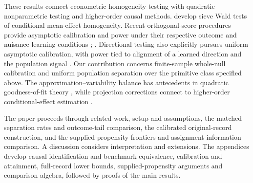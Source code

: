 These results connect econometric homogeneity testing with quadratic nonparametric testing and higher-order causal methods. \citet[Section III]{CrumpHotzImbensMitnik2008Homogeneity} develop sieve Wald tests of conditional mean-effect homogeneity. Recent orthogonal-score procedures provide asymptotic calibration and power under their respective outcome and nuisance-learning conditions \citep[Assumptions 1--5, Theorems 3.1--3.3 and 4.1]{LuSong2026OrthogonalICM}; \citep[Assumptions 3.3--3.4, Proposition 3.1]{LapentaStrittmatterVergara2026Omnibus}. Directional testing also explicitly pursues uniform asymptotic calibration, with power tied to alignment of a learned direction and the population signal \citep[Theorem 1, Corollaries 1--2]{DhawanGuoShah2026Directional}. Our contribution concerns finite-sample whole-null calibration and uniform population separation over the primitive class specified above. The approximation--variability balance has antecedents in quadratic goodness-of-fit theory \citep[Sections 2--4, Theorems 1--2]{IngsterSapatinas2009GoodnessOfFit}, while projection corrections connect to higher-order conditional-effect estimation \citep[Sections 3--4]{KennedyBalakrishnanRobinsWasserman2024MinimaxCATE}.



The paper proceeds through related work, setup and assumptions, the matched separation rates and outcome-tail comparison, the calibrated original-record construction, and the supplied-propensity frontiers and assignment-information comparison. A discussion considers interpretation and extensions. The appendices develop causal identification and benchmark equivalence, calibration and attainment, full-record lower bounds, supplied-propensity arguments and comparison algebra, followed by proofs of the main results.
